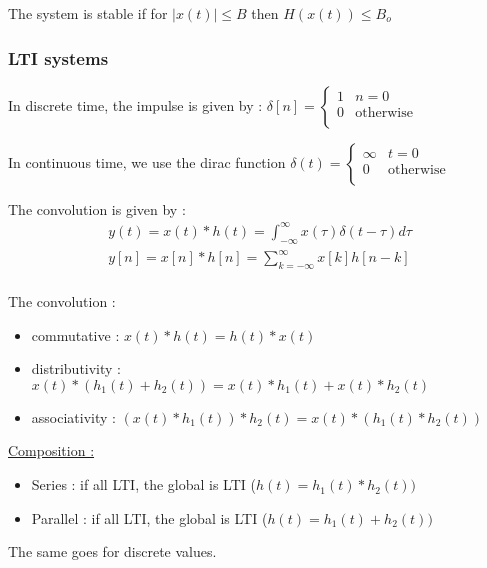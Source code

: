 \documentclass[../main.tex]{subfiles}
\begin{document}
 \begin{theorem}
     The system is stable if for $\lvert x(t) \rvert \leq B$ then $H(x(t)) \leq B_o$
 \end{theorem}

\subsubsection{LTI systems}
In discrete time, the impulse is given by : $\delta[n] = \begin{cases}
    1 & n=0\\
    0 & \text{otherwise}\\
\end{cases}$

In continuous time, we use the dirac function $\delta(t) = \begin{cases}
    \infty & t=0\\
    0 & \text{otherwise}\\
\end{cases}$

The convolution is given by : \begin{equation}
    \begin{gathered}
        y(t) = x(t) * h(t) = \int_{-\infty}^\infty x(\tau) \delta(t-\tau) d\tau\\
        y[n] = x[n] * h[n] = \sum_{k=-\infty}^\infty x[k] h[n-k]\\
    \end{gathered}
\end{equation}

The convolution : \begin{itemize}
    \item commutative : $x(t) * h(t) = h(t) * x(t)$\\
    \item distributivity : $x(t) *(h_1(t) + h_2(t)) = x(t) * h_1(t) + x(t) * h_2(t)$\\
    \item associativity : $(x(t) * h_1(t)) * h_2(t) = x(t) * (h_1(t)*h_2(t))$\\
\end{itemize}

\quad \underline{Composition :}\\

\begin{itemize}
    \item Series : if all LTI, the global is LTI ($h(t) = h_1(t)* h_2(t))$\\
    \item Parallel : if all LTI, the global is LTI ($h(t) = h_1(t) + h_2(t))$\\    
\end{itemize}
\warning The same goes for discrete values.\\
\end{document}
